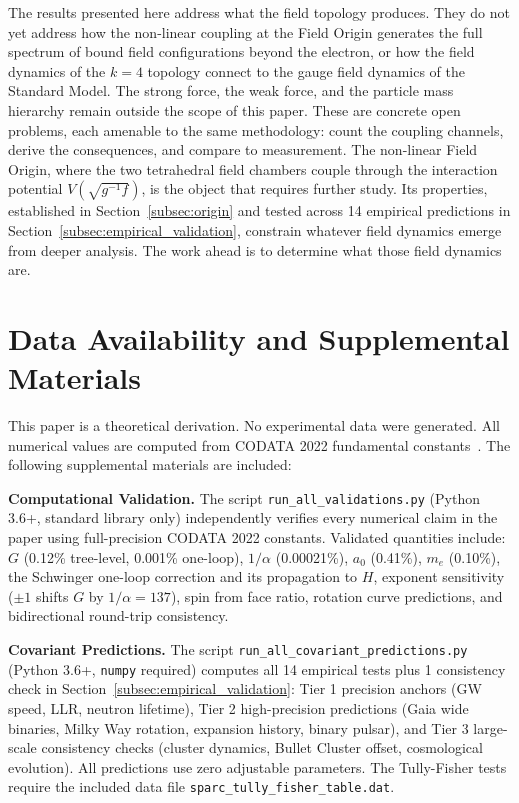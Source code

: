 \documentclass[aps,prd,preprint,superscriptaddress,showpacs,preprintnumbers,amsmath,amssymb,nofootinbib]{revtex4-2}
\begin{document}
The results presented here address what the field topology produces. They do not yet address how the non-linear coupling at the Field Origin generates the full spectrum of bound field configurations beyond the electron, or how the field dynamics of the $k = 4$ topology connect to the gauge field dynamics of the Standard Model. The strong force, the weak force, and the particle mass hierarchy remain outside the scope of this paper. These are concrete open problems, each amenable to the same methodology: count the coupling channels, derive the consequences, and compare to measurement. The non-linear Field Origin, where the two tetrahedral field chambers couple through the interaction potential $V(\sqrt{g^{-1}f})$, is the object that requires further study. Its properties, established in Section~\ref{subsec:origin} and tested across 14 empirical predictions in Section~\ref{subsec:empirical_validation}, constrain whatever field dynamics emerge from deeper analysis. The work ahead is to determine what those field dynamics are.

\section*{Data Availability and Supplemental Materials}

This paper is a theoretical derivation. No experimental data were generated. All numerical values are computed from CODATA 2022 fundamental constants~\cite{codata2022}. The following supplemental materials are included:

\textbf{Computational Validation.}\quad
The script \texttt{run\_all\_validations.py} (Python 3.6+, standard library only) independently verifies every numerical claim in the paper using full-precision CODATA 2022 constants. Validated quantities include: $G$ (0.12\% tree-level, 0.001\% one-loop), $1/\alpha$ (0.00021\%), $a_0$ (0.41\%), $m_e$ (0.10\%), the Schwinger one-loop correction and its propagation to $H$, exponent sensitivity ($\pm 1$ shifts $G$ by $1/\alpha = 137$), spin from face ratio, rotation curve predictions, and bidirectional round-trip consistency.

\textbf{Covariant Predictions.}\quad
The script \texttt{run\_all\_covariant\_predictions.py} (Python 3.6+, \texttt{numpy} required) computes all 14 empirical tests plus 1 consistency check in Section~\ref{subsec:empirical_validation}: Tier 1 precision anchors (GW speed, LLR, neutron lifetime), Tier 2 high-precision predictions (Gaia wide binaries, Milky Way rotation, expansion history, binary pulsar), and Tier 3 large-scale consistency checks (cluster dynamics, Bullet Cluster offset, cosmological evolution). All predictions use zero adjustable parameters. The Tully-Fisher tests require the included data file \texttt{sparc\_tully\_fisher\_table.dat}.
\end{document}
